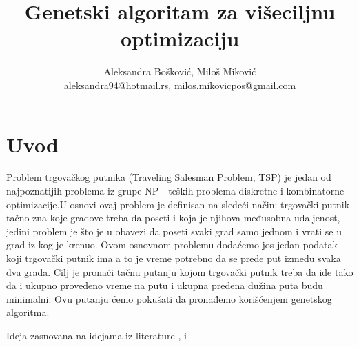 \documentclass[a4paper]{article}
\begin{document}
\title{Genetski algoritam za višeciljnu optimizaciju\\ }

\author{Aleksandra Bošković, Miloš Miković\\ aleksandra94@hotmail.rs, milos.mikovicpos@gmail.com}


\maketitle

\tableofcontents

\newpage

\section{Uvod}
\label{sec:uvod}

Problem trgovačkog putnika (Traveling Salesman Problem, TSP) je jedan od najpoznatijih  problema iz grupe NP - teških problema diskretne i kombinatorne optimizacije.U osnovi ovaj problem je definisan na sledeći način: trgovački putnik tačno zna koje gradove treba da poseti i koja je njihova međusobna udaljenost, jedini problem je što je u obavezi da poseti svaki grad samo jednom i vrati se u grad iz kog je krenuo. Ovom osnovnom problemu dodaćemo jos jedan podatak koji trgovački putnik ima a to je vreme potrebno da se pređe put između svaka dva grada. Cilj je pronaći tačnu putanju kojom trgovački putnik treba da ide tako da i ukupno provedeno vreme na putu i ukupna pređena dužina puta budu minimalni. Ovu putanju ćemo pokušati da pronađemo korišćenjem genetskog algoritma.
\par
Ideja zasnovana na idejama iz literature \cite{2} , \cite{3} i \cite{4}
\end{document}
